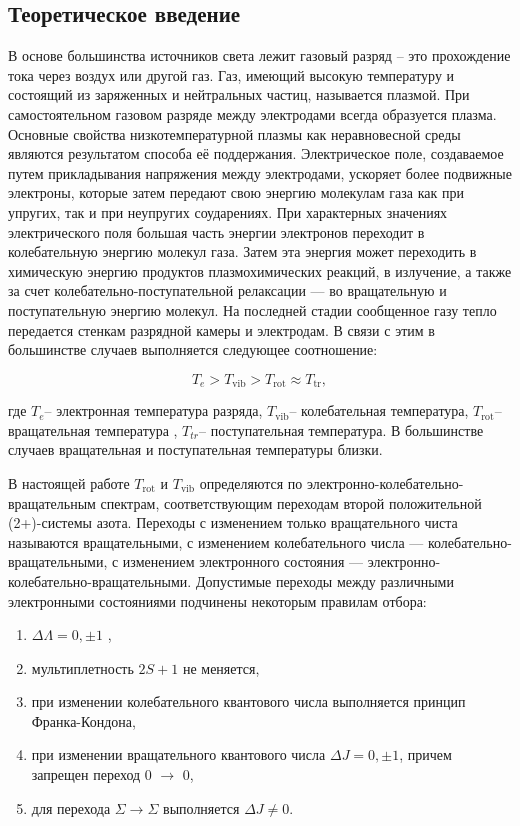 \subsection{Теоретическое введение}
В основе большинства источников света лежит газовый разряд – это прохождение тока через воздух или другой газ. Газ, имеющий высокую температуру и состоящий из заряженных и нейтральных частиц, называется плазмой. При самостоятельном газовом разряде между электродами всегда образуется плазма.
Основные свойства низкотемпературной плазмы как неравновесной среды являются результатом способа её поддержания. Электрическое поле, создаваемое путем прикладывания напряжения между электродами, ускоряет более подвижные электроны, которые затем передают свою энергию молекулам газа как при упругих, так и при неупругих соударениях. При характерных значениях электрического поля большая часть энергии электронов переходит в колебательную энергию молекул газа. Затем эта энергия может переходить в химическую энергию продуктов плазмохимических реакций, в излучение, а также за счет колебательно-поступательной релаксации — во вращательную и поступательную энергию молекул. На последней стадии сообщенное газу тепло передается стенкам разрядной камеры и электродам. В связи с этим в большинстве случаев выполняется следующее соотношение: 

\begin{equation}
T_e > T_\text{vib} > T_\text{rot} \approx T_\text{tr},
\end{equation}

где $T_e$-- электронная температура разряда, $T_\text{vib}$-- колебательная температура, $T_\text{rot}$-- вращательная температура , $T_{tr}$-- поступательная температура. В большинстве случаев вращательная и поступательная температуры близки.

В настоящей работе $T_\text{rot}$ и $T_\text{vib}$ определяются по электронно-колебательно-вращательным спектрам, соответствующим переходам второй положительной (2+)-системы азота. 
Переходы с изменением только вращательного чиста называются вращательными, с изменением колебательного числа — колебательно-вращательными, с изменением электронного состояния — электронно-колебательно-вращательными. 
Допустимые переходы между различными электронными состояниями подчинены некоторым правилам отбора:

\begin{enumerate}
	
	\item $\Delta \Lambda = 0, \pm 1 $ , 
	\item мультиплетность $2S+1$ не меняется,
	\item при изменении колебательного квантового числа выполняется принцип Франка-Кондона,
	\item при изменении вращательного квантового числа $\Delta J = 0, \pm 1 $, причем запрещен переход 0 $\rightarrow $ 0,
	\item для перехода $ \Sigma \rightarrow \Sigma $ выполняется $ \Delta J \neq 0$.	
\end{enumerate}


